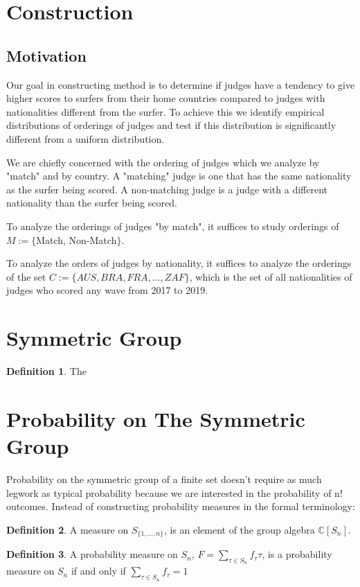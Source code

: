 \documentclass{article}
\theoremstyle{definition}
\newtheorem{definition}{Definition}
\begin{document}
\section{Construction}
\subsection{Motivation}
Our goal in constructing method is to determine if judges have a tendency to give higher scores to surfers from their home countries compared to judges with nationalities different from the surfer. To achieve this we identify empirical distributions of orderings of judges and test if this distribution is significantly different from a uniform distribution.

We are chiefly concerned with the ordering of judges which we analyze by "match" and by country. A "matching" judge is one that has the same nationality as the surfer being scored. A non-matching judge is a judge with a different nationality than the surfer being scored. 


To analyze the orderings of judges "by match", it suffices to study orderings of $M :=\{$Match, Non-Match$\}$. 

To analyze the orders of judges by nationality, it suffices to analyze the orderings of the set $C := \{AUS, BRA, FRA, \dots, ZAF\}$, which is the set of all nationalities of judges who scored any wave from 2017 to 2019.

\section{Symmetric Group}

\begin{definition} The 

\end{definition}

\section{Probability on The Symmetric Group}

Probability on the symmetric group of a finite set doesn't require as much legwork as typical probability because we are interested in the probability of n! outcomes.  Instead of constructing probability measures in the formal terminology:

\begin{definition}  A measure on $S_{\{1,\dots,n\}}$, is an element of the group algebra $\mathbb{C}[S_n]$. \end{definition}
\begin{definition} A probability measure on $S_n$, $F = \sum_{\tau \in S_n} f_\tau \tau $, is a probability measure on $S_n$ if and only if $\sum_{\tau \in S_n} f_\tau = 1$ \end{definition}
\end{document}
